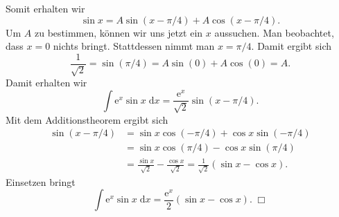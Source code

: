 \documentclass[a4paper,10pt,fleqn,twoside]{scrartcl}
\numberwithin{equation}{section}
\newcommand{\ee}{\mathrm e}
\theoremstyle{Aufgabe}
\begin{document}
Somit erhalten wir
\begin{equation}
\sin x = A\sin (x-\pi/4)+A\cos(x-\pi/4).
\end{equation}
Um $A$ zu bestimmen, können wir uns jetzt ein $x$ aussuchen.
Man beobachtet, dass $x=0$ nichts bringt. Stattdessen nimmt
man $x=\pi/4$. Damit ergibt sich
\begin{equation}
\frac{1}{\sqrt{2}} = \sin(\pi/4) = A\sin(0)+A\cos(0) = A.
\end{equation}
Damit erhalten wir
\begin{equation}
\int \ee^x\sin x\;\mathrm dx = \frac{\ee^x}{\sqrt{2}}\sin(x-\pi/4).
\end{equation}
Mit dem Additionstheorem ergibt sich
\begin{align}
\sin(x-\pi/4) &= \sin x\cos(-\pi/4)+\cos x\sin(-\pi/4)\\
&= \sin x\cos(\pi/4)-\cos x\sin(\pi/4)\\
&= \frac{\sin x}{\sqrt{2}}-\frac{\cos x}{\sqrt{2}}
= \frac{1}{\sqrt{2}}(\sin x-\cos x).
\end{align}
Einsetzen bringt
\begin{equation}
\int \ee^x\sin x\;\mathrm dx = \frac{\ee^x}{2}(\sin x-\cos x).\;\Box
\end{equation}
\end{document}
